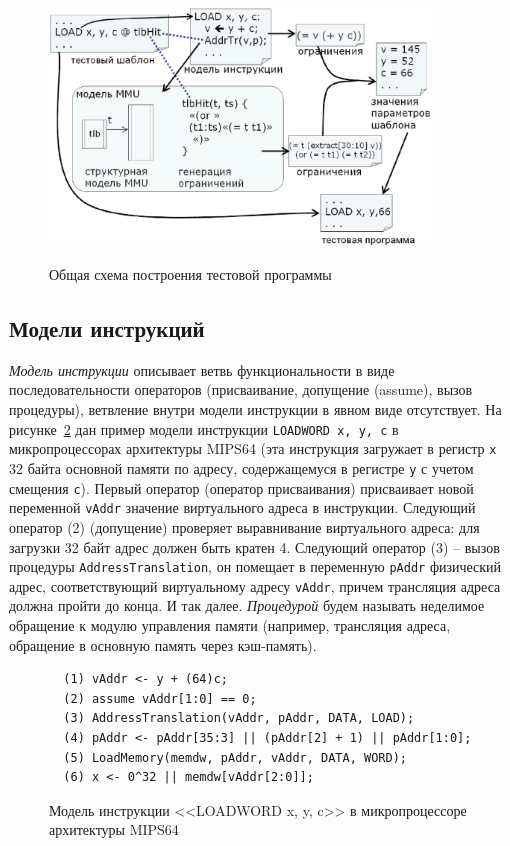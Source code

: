 \begin{figure}[h] \center
  \includegraphics[width=0.9\textwidth]{2.theor/wholesheme}\\
  \caption{Общая схема построения тестовой
  программы}\label{scheme_program_building}
\end{figure}

\subsection{Модели инструкций}

\emph{Модель инструкции} описывает ветвь функциональности в виде
последовательности операторов (присваивание, допущение (assume),
вызов процедуры), ветвление внутри модели инструкции в явном виде
отсутствует. На рисунке~\ref{inst_model_example} дан пример модели
инструкции \texttt{LOADWORD x, y, c} в микропроцессорах архитектуры
\textsc{MIPS64} (эта инструкция загружает в регистр \texttt{x} 32
байта основной памяти по адресу, содержащемуся в регистре \texttt{y}
с учетом смещения \texttt{c}). Первый оператор (оператор
присваивания) присваивает новой переменной \texttt{vAddr} значение
виртуального адреса в инструкции. Следующий оператор (2) (допущение)
проверяет выравнивание виртуального адреса: для загрузки 32 байт
адрес должен быть кратен 4. Следующий оператор (3) -- вызов
процедуры \texttt{AddressTranslation}, он помещает в переменную
\texttt{pAddr} физический адрес, соответствующий виртуальному адресу
\texttt{vAddr}, причем трансляция адреса должна пройти до конца. И
так далее. \emph{Процедурой} будем называть неделимое обращение к
модулю управления памяти (например, трансляция адреса, обращение в
основную память через кэш-память).

\begin{figure}[h]\center
\begin{verbatim}
  (1) vAddr <- y + (64)c;
  (2) assume vAddr[1:0] == 0;
  (3) AddressTranslation(vAddr, pAddr, DATA, LOAD);
  (4) pAddr <- pAddr[35:3] || (pAddr[2] + 1) || pAddr[1:0];
  (5) LoadMemory(memdw, pAddr, vAddr, DATA, WORD);
  (6) x <- 0^32 || memdw[vAddr[2:0]];
\end{verbatim}
\caption{Модель инструкции <<LOADWORD x, y, c>> в микропроцессоре
архитектуры MIPS64}\label{inst_model_example}
\end{figure}

